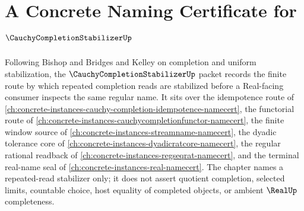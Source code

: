 \chapter{A Concrete Naming Certificate for $\CauchyCompletionStabilizerUp$}
\label{ch:concrete-instances-cauchy-completion-stabilizer-namecert}

Following Bishop and Bridges and Kelley on completion and uniform stabilization, the $\CauchyCompletionStabilizerUp$ packet records the finite route by which repeated completion reads are stabilized before a Real-facing consumer inspects the same regular name. It sits over the idempotence route of \autoref{ch:concrete-instances-cauchy-completion-idempotence-namecert}, the functorial route of \autoref{ch:concrete-instances-cauchycompletionfunctor-namecert}, the finite window source of \autoref{ch:concrete-instances-streamname-namecert}, the dyadic tolerance core of \autoref{ch:concrete-instances-dyadicratcore-namecert}, the regular rational readback of \autoref{ch:concrete-instances-regseqrat-namecert}, and the terminal real-name seal of \autoref{ch:concrete-instances-real-namecert}. The chapter names a repeated-read stabilizer only; it does not assert quotient completion, selected limits, countable choice, host equality of completed objects, or ambient $\RealUp$ completeness.

